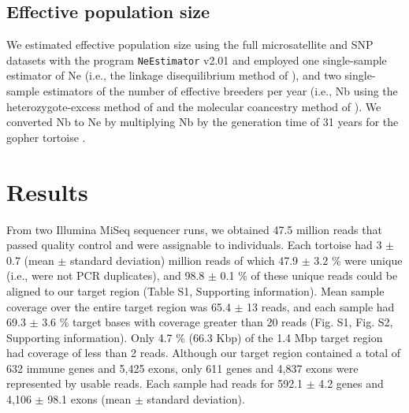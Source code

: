 \documentclass[english]{article}\usepackage[]{graphicx}\usepackage[]{color}
\begin{document}
\subsection*{Effective population size}
We estimated effective population size using the full microsatellite and SNP datasets with the program \texttt{NeEstimator} v2.01 \citep{Do_et_al_2014} and employed one single-sample estimator of Ne (i.e., the linkage disequilibrium method of \citet{Waples_and_Do_2008}), and two single-sample estimators of the number of effective breeders per year (i.e., Nb using the heterozygote-excess method of \citet{Zhdanova_and_Pudovkin_2008} and the molecular coancestry method of \citet{Nomura_2008}). We converted Nb to Ne by multiplying Nb by the generation time of 31 years for the gopher tortoise \citep{Enge_et_al_2006}.

\section*{Results}
From two Illumina MiSeq sequencer runs, we obtained 47.5 million reads that passed quality control and were assignable to individuals. Each tortoise had 3 \begin{math}\pm\end{math} 0.7 (mean \begin{math}\pm\end{math} standard deviation) million reads of which 47.9 \begin{math}\pm\end{math} 3.2 \% were unique (i.e., were not PCR duplicates), and 98.8 \begin{math}\pm\end{math} 0.1 \% of these unique reads could be aligned to our target region (Table S1, Supporting information). Mean sample coverage over the entire target region was 65.4 \begin{math}\pm\end{math} 13 reads, and each sample had 69.3 \begin{math}\pm\end{math} 3.6 \% target bases with coverage greater than 20 reads (Fig. S1, Fig. S2, Supporting information). Only 4.7 \% (66.3 Kbp) of the 1.4 Mbp target region had coverage of less than 2 reads. Although our target region contained a total of 632 immune genes and 5,425 exons, only 611 genes and 4,837 exons were represented by usable reads. Each sample had reads for 592.1 \begin{math}\pm\end{math} 4.2 genes and 4,106 \begin{math}\pm\end{math} 98.1 exons (mean \begin{math}\pm\end{math} standard deviation).
\end{document}

